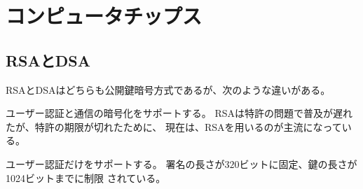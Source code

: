 \section{コンピュータチップス}\label{s1:コンピュータチップス} %
	\subsection{RSAとDSA}\label{s2:RSAとDSA} %
		RSAとDSAはどちらも公開鍵暗号方式であるが、次のような違いがある。
		\begin{description}\setlength{\itemsep}{-1mm} %
			\item[RSA] ユーザー認証と通信の暗号化をサポートする。
			RSAは特許の問題で普及が遅れたが、特許の期限が切れたために、
			現在は、RSAを用いるのが主流になっている。
			\item[DSA] ユーザー認証だけをサポートする。
			署名の長さが$320$ビットに固定、鍵の長さが1024ビットまでに制限
			されている。
		\end{description} %
